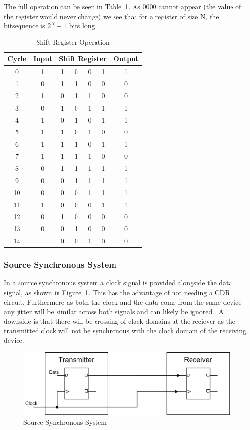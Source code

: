 The full operation can be seen in Table~\ref{tab:shift_reg}. As 0000 cannot
appear (the value of the register would never change) we see that for a register of size N, the
bitsequence is $2^N - 1$ bits long. 
\begin{table}[ht]
    \centering
    \begin{tabular}{|c|c|c c c c|c|}
    \hline
    Cycle & Input & \multicolumn{4}{|c|}{Shift Register} & Output \\
    \hline
     0  & 1 & 1 & 0 & 0 & 1 & 1 \\
     1  & 0 & 1 & 1 & 0 & 0 & 0 \\
     2  & 1 & 0 & 1 & 1 & 0 & 0 \\
     3  & 0 & 1 & 0 & 1 & 1 & 1 \\
     4  & 1 & 0 & 1 & 0 & 1 & 1 \\
     5  & 1 & 1 & 0 & 1 & 0 & 0 \\
     6  & 1 & 1 & 1 & 0 & 1 & 1 \\
     7  & 1 & 1 & 1 & 1 & 0 & 0 \\
     8  & 0 & 1 & 1 & 1 & 1 & 1 \\
     9  & 0 & 0 & 1 & 1 & 1 & 1 \\
     10 & 0 & 0 & 0 & 1 & 1 & 1 \\
     11 & 1 & 0 & 0 & 0 & 1 & 1 \\
     12 & 0 & 1 & 0 & 0 & 0 & 0 \\
     13 & 0 & 0 & 1 & 0 & 0 & 0 \\
     14 &   & 0 & 0 & 1 & 0 & 0 \\
    \hline
    \end{tabular}
    \caption{Shift Register Operation}
    \label{tab:shift_reg}
\end{table}

\subsubsection{Source Synchronous System}%
\label{ssub:source_synchronous_system}
In a source synchronous system a clock signal is provided alongside the data
signal, as shown in Figure~\ref{fig:source_sync}. This has the advantage of not
needing a CDR circuit. Furthermore as both the clock and the data come from the
same device any jitter will be similar across both signals and can likely be
ignored \cite{ragab2011receiver}.   A downside is that there will be crossing
of clock domains at the reciever as the transmitted clock will not be
synchronous with the clock domain of the receiving device.
\begin{figure}[ht]
    \centering
    \includegraphics[width=0.5\linewidth]{img/source_sync.png}
    \caption{Source Synchronous System}%
    \label{fig:source_sync}
\end{figure}



